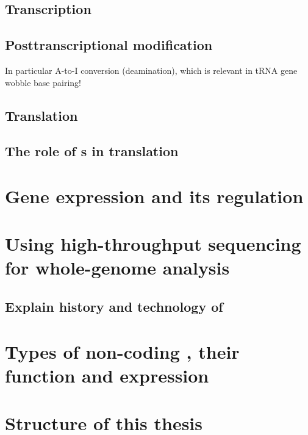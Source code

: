 \subsection{Transcription}

\subsection{Posttranscriptional modification}

In particular A-to-I conversion (deamination), which is relevant in tRNA gene
wobble base pairing!

\subsection{Translation}

\subsection{The role of s in translation}

\section{Gene expression and its regulation}

\section{Using high-throughput sequencing for whole-genome analysis}

\subsection{Explain history and technology of }

\section{Types of non-coding , their function and expression}

\section{Structure of this thesis}
